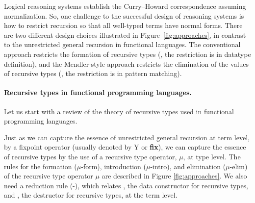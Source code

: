 Logical reasoning systems establish
the Curry--Howard correspondence assuming normalization.
So, one challenge to the successful design of reasoning systems
is how to restrict recursion so that all well-typed terms have normal forms.
There are two different design choices illustrated
in Figure~\ref{fig:approaches}, in contrast to
the unrestricted general recursion in functional languages.
The conventional approach restricts the formation of recursive types
(\ie, the restriction is in datatype definition), and
the Mendler-style approach restricts the elimination of the values of
recursive types (\ie, the restriction is in pattern matching).

\paragraph{Recursive types in functional programming languages.}
Let us start with a review of the theory of recursive types used
in functional programming languages.

Just as we can capture the essence of unrestricted general recursion at term
level, by a fixpoint operator (usually denoted by \textsf{Y} or \textbf{fix}),
we can capture the essence of recursive types by the
use of a recursive type operator, $\mu$, at type level. 
The rules for the formation {\small($\mu$-form)},
introduction {\small($\mu$-intro)}, and elimination {\small($\mu$-elim)} of
the recursive type operator $\mu$ are described in Figure \ref{fig:approaches}.
We also need a reduction rule {\small(\unIn-\In)}, which relates \In,
the data constructor for recursive types, and \unIn, the destructor for
recursive types, at the term level.

